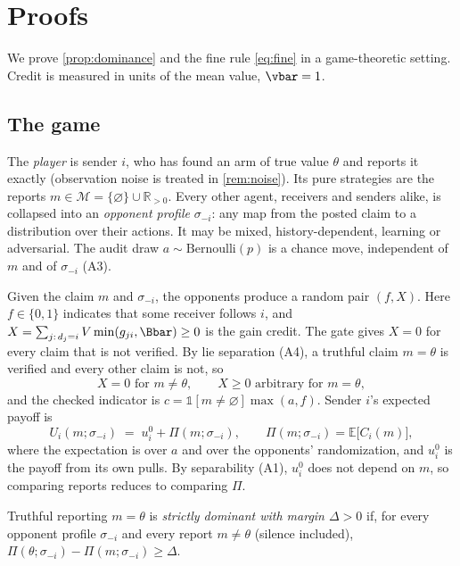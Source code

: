 \section{Proofs}
\label{app:proofs}

We prove \cref{prop:dominance} and the fine rule \cref{eq:fine} in a game-theoretic setting. Credit is measured in units of the mean value, $\vbar=1$.

\subsection{The game}
The \emph{player} is sender $i$, who has found an arm of true value $\theta$ and reports it exactly (observation noise is treated in \cref{rem:noise}). Its pure strategies are the reports $m\in\mathcal M=\{\varnothing\}\cup\mathbb R_{>0}$. Every other agent, receivers and senders alike, is collapsed into an \emph{opponent profile} $\sigma_{-i}$: any map from the posted claim to a distribution over their actions. It may be mixed, history-dependent, learning or adversarial. The audit draw $a\sim\mathrm{Bernoulli}(p)$ is a chance move, independent of $m$ and of $\sigma_{-i}$ (A3).

Given the claim $m$ and $\sigma_{-i}$, the opponents produce a random pair $(f,X)$. Here $f\in\{0,1\}$ indicates that some receiver follows $i$, and $X=\sum_{j:\,d_j=i}V\min(g_{ji},\Bbar)\ge0$ is the gain credit. The gate gives $X=0$ for every claim that is not verified. By lie separation (A4), a truthful claim $m=\theta$ is verified and every other claim is not, so
\begin{equation}
  X=0 \text{ for } m\neq\theta,\qquad X\ge 0 \text{ arbitrary for } m=\theta,
  \label{eq:gate}
\end{equation}
and the checked indicator is $c=\mathbb 1[m\neq\varnothing]\max(a,f)$. Sender $i$'s expected payoff is
\[
  U_i(m;\sigma_{-i}) \;=\; u_i^{0} + \Pi(m;\sigma_{-i}),\qquad \Pi(m;\sigma_{-i})=\mathbb E\big[C_i(m)\big],
\]
where the expectation is over $a$ and over the opponents' randomization, and $u_i^{0}$ is the payoff from its own pulls. By separability (A1), $u_i^{0}$ does not depend on $m$, so comparing reports reduces to comparing $\Pi$.

\begin{definition}
  \label{def:dominance}
  Truthful reporting $m=\theta$ is \emph{strictly dominant with margin $\Delta>0$} if, for every opponent profile $\sigma_{-i}$ and every report $m\neq\theta$ (silence included), $\Pi(\theta;\sigma_{-i})-\Pi(m;\sigma_{-i})\ge\Delta$.
\end{definition}

